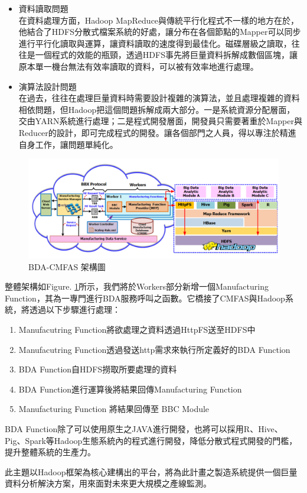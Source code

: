 \documentclass[CJK,12pt,t]{article}
\begin{document}
\begin{CJK*}{UTF8}{bkai}
\begin{itemize}
\begin{itemize}
						\item 資料讀取問題\\
							在資料處理方面，Hadoop MapReduce與傳統平行化程式不一樣的地方在於，他結合了HDFS分散式檔案系統的好處，讓分布在各個節點的Mapper可以同步進行平行化讀取與運算，讓資料讀取的速度得到最佳化。磁碟層級之讀取，往往是一個程式的效能的瓶頸，透過HDFS事先將巨量資料拆解成數個區塊，讓原本單一機台無法有效率讀取的資料，可以被有效率地進行處理。

						\item 演算法設計問題\\
							在過去，往往在處理巨量資料時需要設計複雜的演算法，並且處理複雜的資料相依問題，但Hadoop把這個問題拆解成兩大部分。一是系統資源分配層面，交由YARN系統進行處理；二是程式開發層面，開發員只需要著重於Mapper與Reducer的設計，即可完成程式的開發。讓各個部門之人員，得以專注於精進自身工作，讓問題單純化。
					\end{itemize}
		\end{itemize}

		\begin{figure}[ht]
			\begin{center}
				\includegraphics[scale=0.5]{figs/bda-cmfas.png}
				\caption{BDA-CMFAS 架構圖}
				\label{bda1}
			\end{center}
		\end{figure}

		整體架構如Figure. \ref{bda1}所示，我們將於Workers部分新增一個Manufacturing Function，其為一專門進行BDA服務呼叫之函數。它橋接了CMFAS與Hadoop系統，將透過以下步驟進行處理：
		\begin{enumerate}
			\item Manufacutring Function將欲處理之資料透過HttpFS送至HDFS中
			\item Manufacutring Function透過發送http需求來執行所定義好的BDA Function
			\item BDA Function自HDFS撈取所要處理的資料
			\item BDA Function進行運算後將結果回傳Manufacturing Function
			\item Manufacturing Function 將結果回傳至 BBC Module
		\end{enumerate}
		BDA Function除了可以使用原生之JAVA進行開發，也將可以採用R、Hive、Pig、Spark等Hadoop生態系統內的程式進行開發，降低分散式程式開發的門檻，提升整體系統的生產力。

		此主題以Hadoop框架為核心建構出的平台，將為此計畫之製造系統提供一個巨量資料分析解決方案，用來面對未來更大規模之產線監測。
\end{CJK*}
\end{document}
